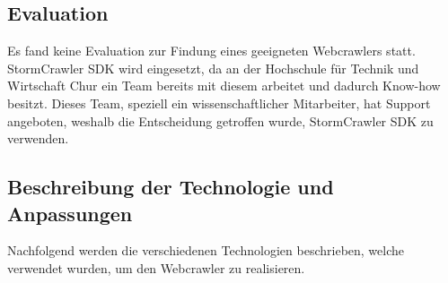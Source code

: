 \subsection{Evaluation}
Es fand keine Evaluation zur Findung eines geeigneten Webcrawlers statt.
StormCrawler SDK wird eingesetzt, da an der Hochschule für Technik und Wirtschaft Chur ein Team bereits mit diesem arbeitet und dadurch Know-how besitzt.
Dieses Team, speziell ein wissenschaftlicher Mitarbeiter, hat Support angeboten, weshalb die Entscheidung getroffen wurde, StormCrawler SDK zu verwenden.
\subsection{Beschreibung der Technologie und Anpassungen}
Nachfolgend werden die verschiedenen Technologien beschrieben, welche verwendet wurden, um den Webcrawler zu realisieren.
